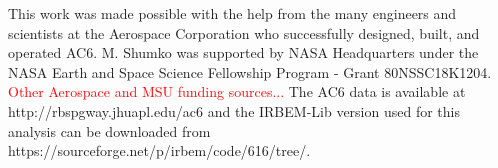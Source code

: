 \documentclass[draft]{agujournal2019}
\begin{document}
\acknowledgments
This work was made possible with the help from the many engineers and scientists at the Aerospace Corporation who successfully designed, built, and operated AC6. M. Shumko was supported by NASA Headquarters under the NASA Earth and Space Science Fellowship Program - Grant 80NSSC18K1204. \textcolor{red}{Other Aerospace and MSU funding sources...} The AC6 data is available at http://rbspgway.jhuapl.edu/ac6 and the IRBEM-Lib version used for this analysis can be downloaded from https://sourceforge.net/p/irbem/code/616/tree/.


%
%



%
%
%
%
%
\end{document}
